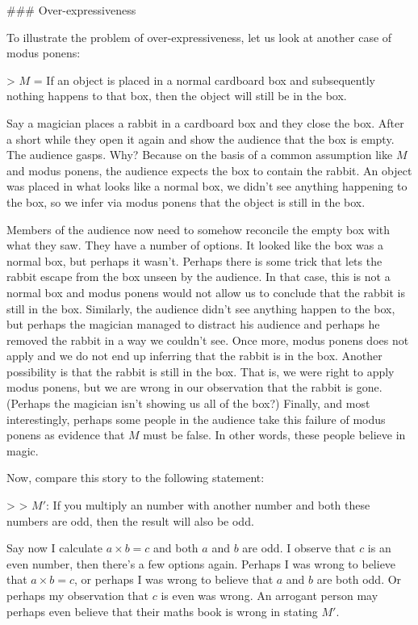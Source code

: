 \documentclass[11pt]{article}
\begin{document}
\#\#\# Over-expressiveness

To illustrate the problem of over-expressiveness, let us look at another case of modus ponens:

> \(M\) = If an object is placed in a normal cardboard box and subsequently nothing happens to that box, then the object will still be in the box.

Say a magician places a rabbit in a cardboard box and they close the box. After a short while they open it again and show the audience that the box is empty. The audience gasps. Why? Because on the basis of a common assumption like \(M\) and modus ponens, the audience expects the box to contain the rabbit. An object was placed in what looks like a normal box, we didn't see anything happening to the box, so we infer via modus ponens that the object is still in the box.

Members of the audience now need to somehow reconcile the empty box with what they saw. They have a number of options. It looked like the box was a normal box, but perhaps it wasn't. Perhaps there is some trick that lets the rabbit escape from the box unseen by the audience. In that case, this is not a normal box and modus ponens would not allow us to conclude that the rabbit is still in the box. Similarly, the audience didn't see anything happen to the box, but perhaps the magician managed to distract his audience and perhaps he removed the rabbit in a way we couldn't see. Once more, modus ponens does not apply and we do not end up inferring that the rabbit is in the box. Another possibility is that the rabbit is still in the box. That is, we were right to apply modus ponens, but we are wrong in our observation that the rabbit is gone. (Perhaps the magician isn't showing us all of the box?) Finally, and most interestingly, perhaps some people in the audience take this failure of modus ponens as evidence that \(M\) must be false. In other words, these people believe in magic. 

Now, compare this story to the following statement:

> > \(M'\): If you multiply an number with another number and both these numbers are odd, then the result will also be odd.

Say now I calculate \(a\times b=c\) and both \(a\) and \(b\) are odd. I observe that \(c\) is an even number, then there's a few options again. Perhaps I was wrong to believe that \(a\times b=c\), or perhaps I was wrong to believe that \(a\) and \(b\) are both odd. Or perhaps my observation that \(c\) is even was wrong. An arrogant person may perhaps even believe that their maths book is wrong in stating \(M'\). 
\end{document}
